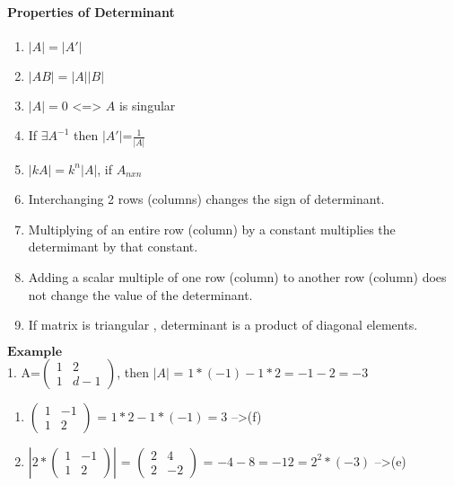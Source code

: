 \documentclass[]{article}
\providecommand{\tightlist}{%
  \setlength{\itemsep}{0pt}\setlength{\parskip}{0pt}}
\let\oldparagraph\paragraph
\renewcommand{\paragraph}[1]{\oldparagraph{#1}\mbox{}}
\begin{document}
\paragraph{\texorpdfstring{Properties of Determinant\\
}{Properties of Determinant }}\label{properties-of-determinant}

\begin{enumerate}
\def\labelenumi{\alph{enumi})}
\item
  \(|A|=|A'|\)
\item
  \(|AB|=|A||B|\)
\item
  \(|A|=0\) \textless{}=\textgreater{} \(A\) is singular
\item
  If \(\exists A^{-1}\) then \(|A'|\)=\(\frac{1}{|A|}\)
\item
  \(|kA|= k^{n}|A|\), if \(A_{nxn}\)
\item
  Interchanging 2 rows (columns) changes the sign of determinant.
\item
  Multiplying of an entire row (column) by a constant multiplies the
  determimant by that constant.
\item
  Adding a scalar multiple of one row (column) to another row (column)
  does not change the value of the determinant.
\item
  If matrix is triangular , determinant is a product of diagonal
  elements.
\end{enumerate}

\(\mathbf{Example}\)\\
 1. A=\(\begin{pmatrix} 1 & 2 \\ 1 & d-1 \end{pmatrix}\), then \(|A|\) =
\(1*(-1)-1*2=-1-2=-3\)\\

\begin{enumerate}
\def\labelenumi{\arabic{enumi}.}
\setcounter{enumi}{1}
\tightlist
\item
  \(\begin{pmatrix} 1 & -1 \\ 1 & 2 \end{pmatrix}\) = \(1*2-1*(-1)=3\)
  --\textgreater{}(f)\\
\item
  \(|2*\begin{pmatrix} 1 & -1 \\ 1 & 2 \end{pmatrix}|\) =
  \(\begin{pmatrix} 2 & 4 \\ 2 & -2 \end{pmatrix}\) =
  \(-4-8=-12=2^2*(-3)\) --\textgreater{}(e)\\
\end{enumerate}
\end{document}

